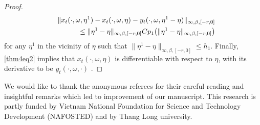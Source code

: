 \documentclass[graybox]{svmult}
\begin{document}
\begin{proof}
	\begin{eqnarray}\label{thm4eq2}
	&&\|x_t(\cdot,\omega,\eta^1)-x_t(\cdot,\omega,\eta)-y_t(\cdot,\omega,\eta^1-\eta)\|_{\infty,\beta,[-r,0]} \notag\\
	&&\leq \|\eta^1 - \eta\|_{\infty,\beta,[-r,0]} C p_1\big(\|\eta^1 - \eta\|_{\infty,\beta,[-r,0]}\big)
	\end{eqnarray}
	for any $\eta^1$ in the vicinity of $\eta$ such that $\|\eta^1 - \eta\|_{\infty,\beta,[-r,0]} \leq h_1$. Finally, \eqref{thm4eq2} implies that $x_t(\cdot,\omega,\eta)$ is differentiable with respect to $\eta$, with its derivative to be $y_t(\cdot,\omega,\cdot)$ . 
\end{proof}


\begin{acknowledgement}
We would like to thank the anonymous referees for their careful reading and insightful remarks which led to improvement of our manuscript.
This research is partly funded by Vietnam National Foundation for Science and Technology Development (NAFOSTED) and by Thang Long university. %
\end{acknowledgement}
%
%
\end{document}
